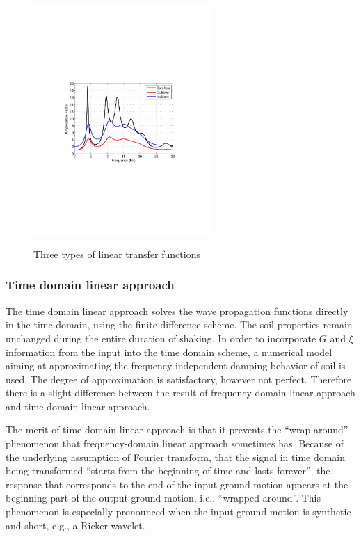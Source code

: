 \documentclass[11pt,letterpaper]{article}
\begin{document}
\begin{figure}[h]
    \centering
  \includegraphics[width=0.6\textwidth]{three_types_of_TF.pdf}\\
  \caption{Three types of linear transfer functions}\label{fig:three-types-of-TF}
\end{figure}




\subsubsection{Time domain linear approach}

The time domain linear approach solves the wave propagation functions directly in the time domain, using the finite difference scheme. The soil properties remain unchanged during the entire duration of shaking. In order to incorporate $G$ and $\xi$ information from the input into the time domain scheme, a numerical model aiming at approximating the frequency independent damping behavior of soil is used. The degree of approximation is satisfactory, however not perfect. Therefore there is a slight difference between the result of frequency domain linear approach and time domain linear approach.

The merit of time domain linear approach is that it prevents the ``wrap-around'' phenomenon that frequency-domain linear approach sometimes has. Because of the underlying assumption of Fourier transform, that the signal in time domain being transformed ``starts from the beginning of time and lasts forever'', the response that corresponds to the end of the input ground motion appears at the beginning part of the output ground motion, i.e., ``wrapped-around''.  This phenomenon is especially pronounced when the input ground motion is synthetic and short, e.g., a Ricker wavelet.
\end{document}
